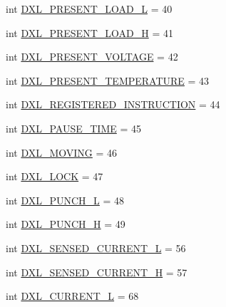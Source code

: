 \begin{DoxyCompactItemize}
\item 
int \hyperlink{namespacedynamixel__driver_1_1dynamixel__const_a4236cb1ae1f4a05cb221e6797b80d7fd}{D\+X\+L\+\_\+\+P\+R\+E\+S\+E\+N\+T\+\_\+\+L\+O\+A\+D\+\_\+L} = 40
\item 
int \hyperlink{namespacedynamixel__driver_1_1dynamixel__const_a82629b08485c972f44c5699a0ad8c4a0}{D\+X\+L\+\_\+\+P\+R\+E\+S\+E\+N\+T\+\_\+\+L\+O\+A\+D\+\_\+H} = 41
\item 
int \hyperlink{namespacedynamixel__driver_1_1dynamixel__const_a209c8e981709e071206c80d28631637d}{D\+X\+L\+\_\+\+P\+R\+E\+S\+E\+N\+T\+\_\+\+V\+O\+L\+T\+A\+GE} = 42
\item 
int \hyperlink{namespacedynamixel__driver_1_1dynamixel__const_adafad263e9e0306bd2c441c21f8e96a0}{D\+X\+L\+\_\+\+P\+R\+E\+S\+E\+N\+T\+\_\+\+T\+E\+M\+P\+E\+R\+A\+T\+U\+RE} = 43
\item 
int \hyperlink{namespacedynamixel__driver_1_1dynamixel__const_a2120642d6b421cbd1e460512cd4790b9}{D\+X\+L\+\_\+\+R\+E\+G\+I\+S\+T\+E\+R\+E\+D\+\_\+\+I\+N\+S\+T\+R\+U\+C\+T\+I\+ON} = 44
\item 
int \hyperlink{namespacedynamixel__driver_1_1dynamixel__const_a0720a14ea26d88ad0ddaf2ec2b12eaec}{D\+X\+L\+\_\+\+P\+A\+U\+S\+E\+\_\+\+T\+I\+ME} = 45
\item 
int \hyperlink{namespacedynamixel__driver_1_1dynamixel__const_a32c745ca02d7ecaec310cf6d64f9b2fc}{D\+X\+L\+\_\+\+M\+O\+V\+I\+NG} = 46
\item 
int \hyperlink{namespacedynamixel__driver_1_1dynamixel__const_a413d6dbde3c1d5d9bdf61dfe3a4af9dc}{D\+X\+L\+\_\+\+L\+O\+CK} = 47
\item 
int \hyperlink{namespacedynamixel__driver_1_1dynamixel__const_a65b246a2d71782b31a7059d02073ec50}{D\+X\+L\+\_\+\+P\+U\+N\+C\+H\+\_\+L} = 48
\item 
int \hyperlink{namespacedynamixel__driver_1_1dynamixel__const_a442057d489e61ca56339efb0d88d32f3}{D\+X\+L\+\_\+\+P\+U\+N\+C\+H\+\_\+H} = 49
\item 
int \hyperlink{namespacedynamixel__driver_1_1dynamixel__const_addbd315010ca25355782d0588b9d74af}{D\+X\+L\+\_\+\+S\+E\+N\+S\+E\+D\+\_\+\+C\+U\+R\+R\+E\+N\+T\+\_\+L} = 56
\item 
int \hyperlink{namespacedynamixel__driver_1_1dynamixel__const_a5206d598c3fca38c68556b6355614dd9}{D\+X\+L\+\_\+\+S\+E\+N\+S\+E\+D\+\_\+\+C\+U\+R\+R\+E\+N\+T\+\_\+H} = 57
\item 
int \hyperlink{namespacedynamixel__driver_1_1dynamixel__const_af26850517db773706fc59ac833d05670}{D\+X\+L\+\_\+\+C\+U\+R\+R\+E\+N\+T\+\_\+L} = 68

\end{DoxyCompactItemize}
